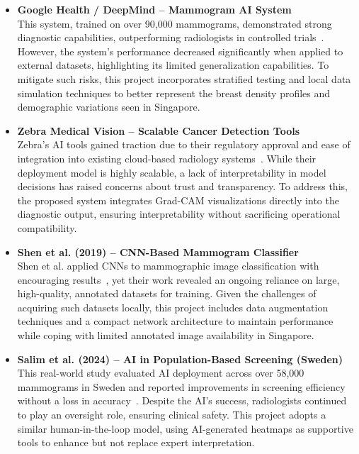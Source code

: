 \documentclass[12pt]{article}
\begin{document}
\begin{itemize}
    \item \textbf{Google Health / DeepMind – Mammogram AI System} \\
    This system, trained on over 90{,}000 mammograms, demonstrated strong diagnostic capabilities, outperforming radiologists in controlled trials~\cite{11}. However, the system's performance decreased significantly when applied to external datasets, highlighting its limited generalization capabilities. To mitigate such risks, this project incorporates stratified testing and local data simulation techniques to better represent the breast density profiles and demographic variations seen in Singapore.

    \item \textbf{Zebra Medical Vision – Scalable Cancer Detection Tools} \\
    Zebra’s AI tools gained traction due to their regulatory approval and ease of integration into existing cloud-based radiology systems~\cite{12}. While their deployment model is highly scalable, a lack of interpretability in model decisions has raised concerns about trust and transparency. To address this, the proposed system integrates Grad-CAM visualizations directly into the diagnostic output, ensuring interpretability without sacrificing operational compatibility.

    \item \textbf{Shen et al. (2019) – CNN-Based Mammogram Classifier} \\
    Shen et al. applied CNNs to mammographic image classification with encouraging results~\cite{7}, yet their work revealed an ongoing reliance on large, high-quality, annotated datasets for training. Given the challenges of acquiring such datasets locally, this project includes data augmentation techniques and a compact network architecture to maintain performance while coping with limited annotated image availability in Singapore.

    \item \textbf{Salim et al. (2024) – AI in Population-Based Screening (Sweden)} \\
    This real-world study evaluated AI deployment across over 58{,}000 mammograms in Sweden and reported improvements in screening efficiency without a loss in accuracy~\cite{13}. Despite the AI’s success, radiologists continued to play an oversight role, ensuring clinical safety. This project adopts a similar human-in-the-loop model, using AI-generated heatmaps as supportive tools to enhance but not replace expert interpretation.
\end{itemize}
\end{document}
